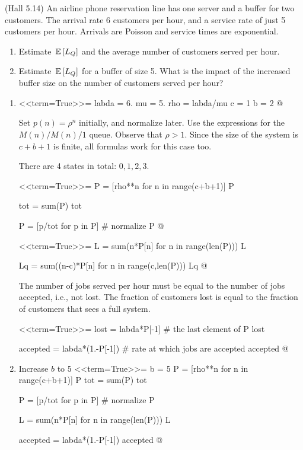 \begin{question}
  (Hall 5.14) An airline phone reservation line has one server and a
  buffer for two customers. The arrival rate 6 customers per hour, and
  a service rate of just 5 customers per hour. Arrivals are Poisson and service times are exponential. 
  \begin{enumerate}
  \item Estimate $\,\mathbb{E}\left[L_Q\right]$ and the average number of customers served per hour.
  \item Estimate $\,\mathbb{E}\left[L_Q\right]$ for a buffer of size 5. What is the impact of the increased buffer size on the number of customers served per hour?
  \end{enumerate}
  
    \begin{solution}
      \begin{enumerate}

      \item 

<<term=True>>=
labda = 6.
mu = 5.
rho = labda/mu
c = 1
b = 2
@ 

Set $p(n) = \rho^n$ initially, and normalize later. Use the
expressions for the $M(n)/M(n)/1$ queue.  Observe that $\rho>1$. Since
the size of the system is $c+b+1$ is finite, all formulas work for
this case too.


There are 4 states in total: $0,1,2,3$.

<<term=True>>=
P = [rho**n for n in range(c+b+1)]
P

tot = sum(P)
tot

P = [p/tot for p in P] # normalize
P
@ 

<<term=True>>=
L = sum(n*P[n] for n in range(len(P)))
L

Lq = sum((n-c)*P[n] for n in range(c,len(P)))
Lq
@ 


The number of jobs served per hour must be equal to the number of jobs
accepted, i.e., not lost. The fraction of customers lost is equal to
the fraction of customers that sees a full system.

<<term=True>>=
lost = labda*P[-1] # the last element of P
lost

accepted = labda*(1.-P[-1]) # rate at which jobs are accepted
accepted
@  

\item 

 Increase $b$ to 5
<<term=True>>=
b = 5
P = [rho**n for n in range(c+b+1)]
P
tot = sum(P)
tot

P = [p/tot for p in P] # normalize
P

L = sum(n*P[n] for n in range(len(P)))
L

accepted = labda*(1.-P[-1])
accepted
@      
  \end{enumerate}
    \end{solution}
\end{question}

